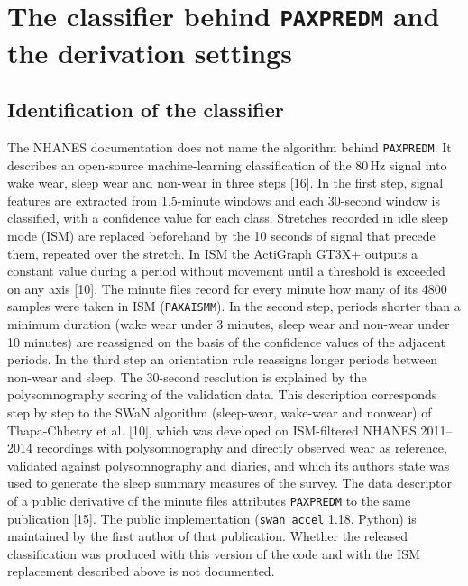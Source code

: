 \documentclass[12pt]{article}
\begin{document}
\begin{table}[htbp]
\centering
\caption{SRI--BMI multiplication factor (top versus bottom SRI quintile) by
input variant and calculator, computed with the method and models of the
earlier study (Models 1 to 3 of its Table~3, survey-weighted, 95\% bootstrap intervals).
Model~1 adjusts for age and sex, Model~2 is fully adjusted and Model~3 adds a sex $\times$ SRI interaction and is
shown for women and for men. The first row refits the published SRI values.}
\label{tab:S_assoc}
\small\setlength{\tabcolsep}{3pt}
\resizebox{\textwidth}{!}{}
\end{table}

\clearpage
\section{The classifier behind \texttt{PAXPREDM} and the derivation settings}
\label{sec:S_classifier}
\subsection{Identification of the classifier}
The NHANES documentation does not name the algorithm behind \texttt{PAXPREDM}. It describes an open-source machine-learning classification of the 80\,Hz signal into wake wear, sleep wear and non-wear in three steps [16]. In the first step, signal features are extracted from 1.5-minute windows and each 30-second window is classified, with a confidence value for each class. Stretches recorded in idle sleep mode (ISM) are replaced beforehand by the 10 seconds of signal that precede them, repeated over the stretch. In ISM the ActiGraph GT3X+ outputs a constant value during a period without movement until a threshold is exceeded on any axis [10]. The minute files record for every minute how many of its 4800 samples were taken in ISM (\texttt{PAXAISMM}). In the second step, periods shorter than a minimum duration (wake wear under 3 minutes, sleep wear and non-wear under 10 minutes) are reassigned on the basis of the confidence values of the adjacent periods. In the third step an orientation rule reassigns longer periods between non-wear and sleep. The 30-second resolution is explained by the polysomnography scoring of the validation data. This description corresponds step by step to the SWaN algorithm (sleep-wear, wake-wear and nonwear) of Thapa-Chhetry et al. [10], which was developed on ISM-filtered NHANES 2011--2014 recordings with polysomnography and directly observed wear as reference, validated against polysomnography and diaries, and which its authors state was used to generate the sleep summary measures of the survey. The data descriptor of a public derivative of the minute files attributes \texttt{PAXPREDM} to the same publication [15]. The public implementation (\texttt{swan\_accel} 1.18, Python) is maintained by the first author of that publication. Whether the released classification was produced with this version of the code and with the ISM replacement described above is not documented.
\end{document}
